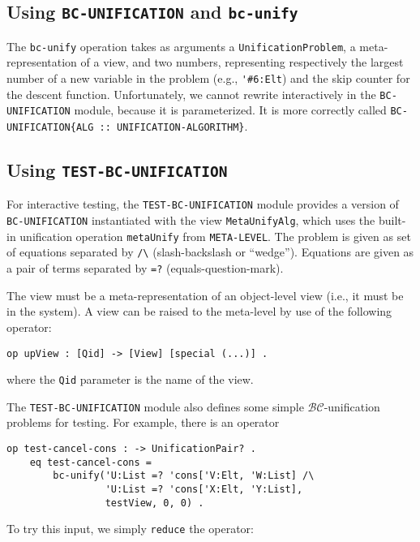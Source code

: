 \documentclass[11pt]{article}
\newcommand{\BC}{\mathcal{BC}}
\newcommand{\TitleListing}[1]{\texorpdfstring{\lstinline|#1|}{#1}}
\begin{document}


\subsection{Using \TitleListing{BC-UNIFICATION} and \TitleListing{bc-unify}}
\label{subappendix:using-bc-unif-mod}

The \lstinline|bc-unify| operation takes as arguments a
\lstinline|UnificationProblem|, a meta-representation of a view, and two
numbers, representing respectively the largest number of a new variable in the
problem (e.g., \lstinline|'#6:Elt|) and the skip counter for the descent
function. Unfortunately, we cannot rewrite interactively in the
\lstinline|BC-UNIFICATION| module, because it is parameterized. It is more
correctly called \lstinline|BC-UNIFICATION{ALG :: UNIFICATION-ALGORITHM}|.

\subsection{Using \TitleListing{TEST-BC-UNIFICATION}}
\label{subappendix:using-bc-test-mod}

For interactive testing, the \lstinline|TEST-BC-UNIFICATION| module provides a
version of \lstinline|BC-UNIFICATION| instantiated with the view
\lstinline|MetaUnifyAlg|, which uses the built-in unification operation
\lstinline|metaUnify| from \lstinline|META-LEVEL|. The problem is given as
set of equations separated by \lstinline|/\| (slash-backslash or ``wedge'').
Equations are given as a pair of terms separated by \lstinline|=?|
(equals-question-mark).

The view must be a meta-representation of an object-level view (i.e., it must
be in the system). A view can be raised to the meta-level by use of the
following operator:
\begin{lstlisting}[language=Maude, style=smalllisting]
    op upView : [Qid] -> [View] [special (...)] .
\end{lstlisting}
where the \lstinline|Qid| parameter is the name of the view.
\vspace{1ex}



The \lstinline|TEST-BC-UNIFICATION| module also defines some simple
$\BC$-unification problems for testing. For example, there is an operator
\begin{lstlisting}[language=Maude, style=smalllisting]
    op test-cancel-cons : -> UnificationPair? .
    eq test-cancel-cons =
        bc-unify('U:List =? 'cons['V:Elt, 'W:List] /\
                 'U:List =? 'cons['X:Elt, 'Y:List],
                 testView, 0, 0) .
\end{lstlisting}
To try this input, we simply \lstinline|reduce| the operator:
\vspace{1ex}
\end{document}
